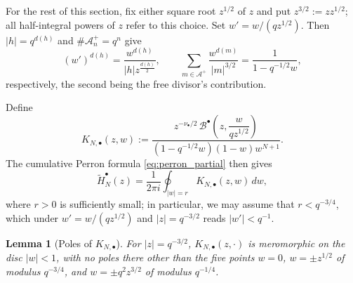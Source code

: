 \documentclass[a4paper,reqno]{amsart}
\numberwithin{equation}{section}
\newtheorem{lemma}[theorem]{Lemma}
\theoremstyle{remark}
\theoremstyle{definition}
\newcommand{\A}{\mathcal{A}}
\begin{document}
For the rest of this section, fix either square root $z^{1/2}$ of $z$ and
put $z^{3/2}:=zz^{1/2}$; all half-integral powers of $z$ refer to this
choice.
Set $w'=w/(qz^{1/2})$. Then $|h|=q^{d(h)}$ and $\#\A_n^+=q^n$ give
$$
(w')^{d(h)}=\frac{w^{d(h)}}{|h|z^{\frac{d(h)}{2}}}, \qquad
\sum_{m\in\A^+}\frac{w^{d(m)}}{|m|^{3/2}}=\frac{1}{1-q^{-1/2}w},
$$
respectively, the second being the free divisor's contribution.

Define
$$
K_{N,\bullet}(z,w)
:=
\frac{
z^{-\nu_\bullet/2}\,
\mathcal B^{\bullet}\!\left(z,\dfrac{w}{qz^{1/2}}\right)
}{
(1-q^{-1/2}w)(1-w)w^{N+1}
}.
$$
The cumulative Perron formula \eqref{eq:perron_partial} then gives
\begin{equation}\label{eq:Htilde-perron}
\widetilde H_N^{\bullet}(z)
=
\frac{1}{2\pi i}
\oint_{|w|=r}
K_{N,\bullet}(z,w)\,dw,
\end{equation}
where $r>0$ is sufficiently small; in particular, we may assume that
$r<q^{-3/4}$, which under $w'=w/(qz^{1/2})$ and $|z|=q^{-3/2}$ reads
$|w'|<q^{-1}$.

\begin{lemma}[Poles of $K_{N,\bullet}$]
\label{lem:K-poles}
For $|z|=q^{-3/2}$, $K_{N,\bullet}(z,\cdot)$ is meromorphic on the disc
$|w|<1$, with no poles there other than the five points $w=0$,
$w=\pm z^{1/2}$ of modulus $q^{-3/4}$, and $w=\pm q^{2}z^{3/2}$ of modulus
$q^{-1/4}$.
\end{lemma}
\end{document}
